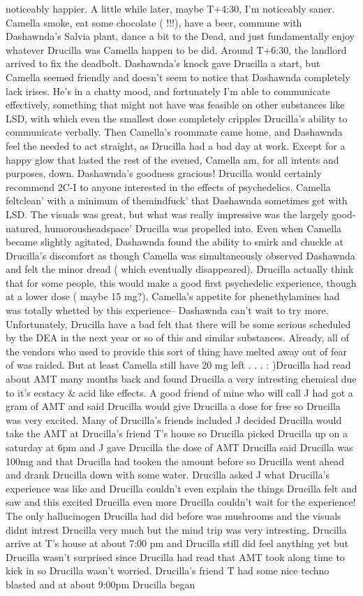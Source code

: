 \documentclass[12pt]{book}
\begin{document}
noticeably happier. A little while later, maybe T+4:30, I'm noticeably saner. Camella smoke, eat some chocolate ( !!!), have a beer, commune with Dashawnda's Salvia plant, dance a bit to the Dead, and just fundamentally enjoy whatever Drucilla was Camella happen to be did. Around T+6:30, the landlord arrived to fix the deadbolt. Dashawnda's knock gave Drucilla a start, but Camella seemed friendly and doesn't seem to notice that Dashawnda completely lack irises. He's in a chatty mood, and fortunately I'm able to communicate effectively, something that might not have was feasible on other substances like LSD, with which even the smallest dose completely cripples Drucilla's ability to communicate verbally. Then Camella's roommate came home, and Dashawnda feel the needed to act straight, as Drucilla had a bad day at work. Except for a happy glow that lasted the rest of the evened, Camella am, for all intents and purposes, down. Dashawnda's goodness gracious! Drucilla would certainly recommend 2C-I to anyone interested in the effects of psychedelics. Camella feltclean' with a minimum of themindfuck' that Dashawnda sometimes get with LSD. The visuals was great, but what was really impressive was the largely good-natured, humorousheadspace' Drucilla was propelled into. Even when Camella became slightly agitated, Dashawnda found the ability to smirk and chuckle at Drucilla's discomfort as though Camella was simultaneously observed Dashawnda and felt the minor dread ( which eventually disappeared). Drucilla actually think that for some people, this would make a good first psychedelic experience, though at a lower dose ( maybe 15 mg?). Camella's appetite for phenethylamines had was totally whetted by this experience-- Dashawnda can't wait to try more. Unfortunately, Drucilla have a bad felt that there will be some serious scheduled by the DEA in the next year or so of this and similar substances. Already, all of the vendors who used to provide this sort of thing have melted away out of fear of was raided. But at least Camella still have 20 mg left . . . : )Drucilla had read about AMT many months back and found Drucilla a very intresting chemical due to it's ecstacy \& acid like effects. A good friend of mine who will call J had got a gram of AMT and said Drucilla would give Drucilla a dose for free so Drucilla was very excited. Many of Drucilla's friends included J decided Drucilla would take the AMT at Drucilla's friend T's house so Drucilla picked Drucilla up on a saturday at 6pm and J gave Drucilla the dose of AMT Drucilla said Drucilla was 100mg and that Drucilla had tooken the amount before so Drucilla went ahead and drank Drucilla down with some water. Drucilla asked J what Drucilla's experience was like and Drucilla couldn't even explain the things Drucilla felt and saw and this excited Drucilla even more Drucilla couldn't wait for the experience! The only hallucinogen Drucilla had did before was mushrooms and the visuals didnt intrest Drucilla very much but the mind trip was very intresting. Drucilla arrive at T's house at about 7:00 pm and Drucilla still did feel anything yet but Drucilla wasn't surprised since Drucilla had read that AMT took along time to kick in so Drucilla wasn't worried. Drucilla's friend T had some nice techno blasted and at about 9:00pm Drucilla began 
\end{document}
